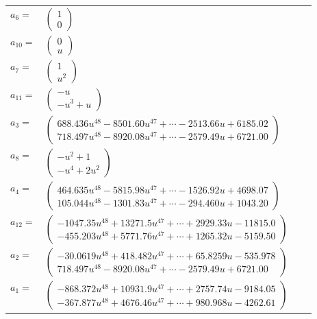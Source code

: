 \documentclass[1p]{elsarticle_modified}
\theoremstyle{definition}
\begin{document}
\begin{tabular}{m{7pt} m{180pt} m{7pt} m{180pt} }
\flushright $a_{6}=$&$\begin{pmatrix}1\\0\end{pmatrix}$ \\
\flushright $a_{10}=$&$\begin{pmatrix}0\\u\end{pmatrix}$ \\
\flushright $a_{7}=$&$\begin{pmatrix}1\\u^2\end{pmatrix}$ \\
\flushright $a_{11}=$&$\begin{pmatrix}- u\\- u^3+u\end{pmatrix}$ \\
\flushright $a_{3}=$&$\begin{pmatrix}688.436 u^{48}-8501.60 u^{47}+\cdots-2513.66 u+6185.02\\718.497 u^{48}-8920.08 u^{47}+\cdots-2579.49 u+6721.00\end{pmatrix}$ \\
\flushright $a_{8}=$&$\begin{pmatrix}- u^2+1\\- u^4+2 u^2\end{pmatrix}$ \\
\flushright $a_{4}=$&$\begin{pmatrix}464.635 u^{48}-5815.98 u^{47}+\cdots-1526.92 u+4698.07\\105.044 u^{48}-1301.83 u^{47}+\cdots-294.460 u+1043.20\end{pmatrix}$ \\
\flushright $a_{12}=$&$\begin{pmatrix}-1047.35 u^{48}+13271.5 u^{47}+\cdots+2929.33 u-11815.0\\-455.203 u^{48}+5771.76 u^{47}+\cdots+1265.32 u-5159.50\end{pmatrix}$ \\
\flushright $a_{2}=$&$\begin{pmatrix}-30.0619 u^{48}+418.482 u^{47}+\cdots+65.8259 u-535.978\\718.497 u^{48}-8920.08 u^{47}+\cdots-2579.49 u+6721.00\end{pmatrix}$ \\
\flushright $a_{1}=$&$\begin{pmatrix}-868.372 u^{48}+10931.9 u^{47}+\cdots+2757.74 u-9184.05\\-367.877 u^{48}+4676.46 u^{47}+\cdots+980.968 u-4262.61\end{pmatrix}$ \\

\end{tabular}
\end{document}
